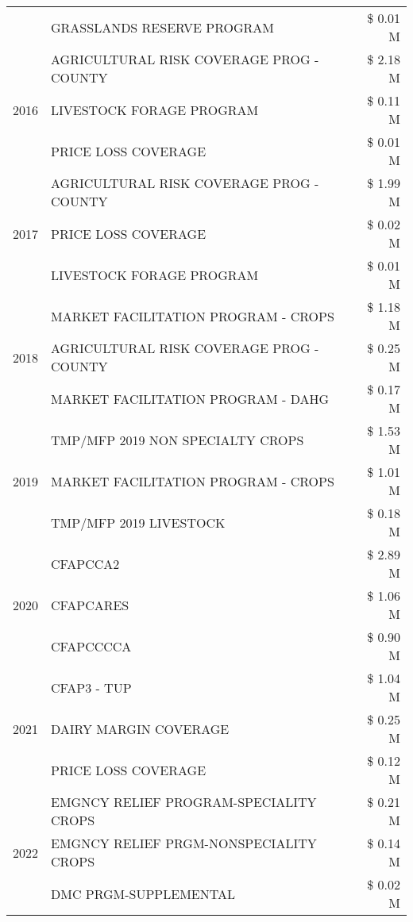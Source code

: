 \begin{tabular}{llr}
 & GRASSLANDS RESERVE PROGRAM & \$ 0.01 M \\
\cline{1-3}
\multirow[t]{3}{*}{2016} & AGRICULTURAL RISK COVERAGE PROG - COUNTY & \$ 2.18 M \\
 & LIVESTOCK FORAGE PROGRAM & \$ 0.11 M \\
 & PRICE LOSS COVERAGE & \$ 0.01 M \\
\cline{1-3}
\multirow[t]{3}{*}{2017} & AGRICULTURAL RISK COVERAGE PROG - COUNTY & \$ 1.99 M \\
 & PRICE LOSS COVERAGE & \$ 0.02 M \\
 & LIVESTOCK FORAGE PROGRAM & \$ 0.01 M \\
\cline{1-3}
\multirow[t]{3}{*}{2018} & MARKET FACILITATION PROGRAM - CROPS & \$ 1.18 M \\
 & AGRICULTURAL RISK COVERAGE PROG - COUNTY & \$ 0.25 M \\
 & MARKET FACILITATION PROGRAM - DAHG & \$ 0.17 M \\
\cline{1-3}
\multirow[t]{3}{*}{2019} & TMP/MFP 2019 NON SPECIALTY CROPS & \$ 1.53 M \\
 & MARKET FACILITATION PROGRAM - CROPS & \$ 1.01 M \\
 & TMP/MFP 2019 LIVESTOCK & \$ 0.18 M \\
\cline{1-3}
\multirow[t]{3}{*}{2020} & CFAPCCA2 & \$ 2.89 M \\
 & CFAPCARES & \$ 1.06 M \\
 & CFAPCCCCA & \$ 0.90 M \\
\cline{1-3}
\multirow[t]{3}{*}{2021} & CFAP3 - TUP & \$ 1.04 M \\
 & DAIRY MARGIN COVERAGE & \$ 0.25 M \\
 & PRICE LOSS COVERAGE & \$ 0.12 M \\
\cline{1-3}
\multirow[t]{3}{*}{2022} & EMGNCY RELIEF PROGRAM-SPECIALITY CROPS & \$ 0.21 M \\
 & EMGNCY RELIEF PRGM-NONSPECIALITY CROPS & \$ 0.14 M \\
 & DMC PRGM-SUPPLEMENTAL & \$ 0.02 M \\
\cline{1-3}
\bottomrule
\end{tabular}
